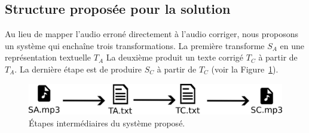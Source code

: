 \subsection{Structure proposée pour la solution}

Au lieu de mapper l'audio erroné directement à l'audio corriger,
nous proposons un système qui enchaîne trois transformations.
La première transforme \(S_A\) en une représentation textuelle \(T_A\)
La deuxième produit un texte corrigé \(T_C\) à partir de \(T_A\).
La dernière étape est de produire \(S_C\) à partir de \(T_C\) (voir la Figure~\ref{fig.detail-system}).

\begin{figure}[hbt]
    \centering
    \includegraphics[width=\linewidth]{assets/images/detail.png}
    \caption{Étapes intermédiaires du système proposé.}
    \label{fig.detail-system}
\end{figure}